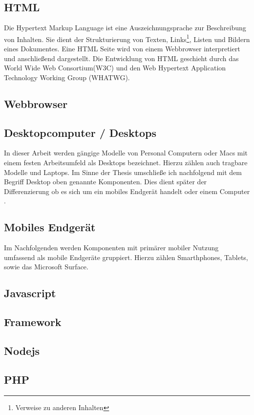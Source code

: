 		\subsection{HTML}
		Die Hypertext Markup Language ist eine Auszeichnungsprache zur Beschreibung von Inhalten. Sie dient der Strukturierung 		von Texten, Links\footnote{Verweise zu anderen Inhalten}, Listen und Bildern eines Dokumentes. Eine HTML Seite wird von 		einem Webbrowser interpretiert und anschließend dargestellt. Die Entwicklung von HTML geschieht durch das World Wide 		Web Consortium(W3C) und den Web Hypertext Application Technology Working Group (WHATWG). 

		\subsection{Webbrowser}
		\subsection{Desktopcomputer / Desktops}
		In dieser Arbeit werden gängige Modelle von Personal Computern oder Macs mit einem festen Arbeitsumfeld als Desktops 		bezeichnet. Hierzu zählen auch tragbare Modelle und Laptops. Im Sinne der Thesis umschließe ich nachfolgend mit dem 		Begriff Desktop oben genannte Komponenten. Dies dient später der Differenzierung ob es sich um ein mobiles Endgerät 			handelt oder einem Computer .

		\subsection{Mobiles Endgerät}
		Im Nachfolgenden werden Komponenten mit primärer mobiler Nutzung umfassend als mobile Endgeräte gruppiert. Hierzu 		zählen Smarthphones, Tablets, sowie das Microsoft Surface.

		\subsection{Javascript}
		\subsection{Framework}
		\subsection{Nodejs}
		\subsection{PHP}
